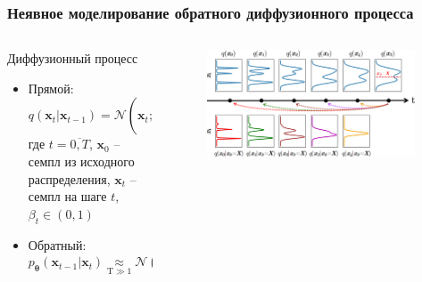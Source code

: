 \documentclass[8pt]{beamer}
\begin{document}
\begin{frame}
	\frametitle{Неявное моделирование обратного диффузионного процесса}


	\begin{columns}
		\begin{column}{0.5\textwidth}
			\begin{block}{Диффузионный процесс}
				\begin{itemize}
				
					\item Прямой: 
					\begin{equation*}
					q(\textbf{x}_t|\textbf{x}_{t-1}) = \mathcal{N}(\textbf{x}_t; \textbf{x}_{t-1}\sqrt{1-\beta_t}, \beta_t 	\textbf{I})
					\end{equation*}
					где $t = \overline{0,T}$, $\textbf{x}_0$ -- семпл из исходного распределения, $\textbf{x}_t$ -- семпл на шаге $t$, $\beta_t\in (0,1)$\\
					
					\item Обратный: 
					\begin{equation*}
						p_{\boldsymbol{\theta}}(\textbf{x}_{t-1}|\textbf{x}_t)\!\! \underset{\text{T} \gg 1}{ \approx}\!\!\! \mathcal{N}(\textbf{x}_{t-1};\mu_{\boldsymbol{\theta}}(\textbf{x}_t, t), \Sigma_{\boldsymbol{\theta}}(\textbf{x}_t, t))
					\end{equation*}
			
				\end{itemize}
			\end{block}		
		\end{column}
		
		\begin{column}{0.55\textwidth} 
				\begin{figure}[h!]
						\begin{flushright}
							\includegraphics[width=0.97\textwidth]{figures/distributions.png}
						\end{flushright}	
				\end{figure}
	

\end{column}
\end{columns}
\end{frame}
\end{document}
